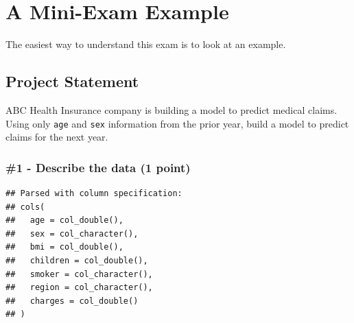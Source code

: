 \documentclass[]{book}
\newenvironment{Shaded}{\begin{snugshade}}{\end{snugshade}}
\newcommand{\CommentTok}[1]{\textcolor[rgb]{0.56,0.35,0.01}{\textit{#1}}}
\newcommand{\DataTypeTok}[1]{\textcolor[rgb]{0.13,0.29,0.53}{#1}}
\newcommand{\KeywordTok}[1]{\textcolor[rgb]{0.13,0.29,0.53}{\textbf{#1}}}
\newcommand{\NormalTok}[1]{#1}
\newcommand{\OperatorTok}[1]{\textcolor[rgb]{0.81,0.36,0.00}{\textbf{#1}}}
\newcommand{\StringTok}[1]{\textcolor[rgb]{0.31,0.60,0.02}{#1}}
\begin{document}
\hypertarget{a-mini-exam-example}{%
\chapter{A Mini-Exam Example}\label{a-mini-exam-example}}

The easiest way to understand this exam is to look at an example.

\hypertarget{project-statement}{%
\section{Project Statement}\label{project-statement}}

ABC Health Insurance company is building a model to predict medical claims. Using only \texttt{age} and \texttt{sex} information from the prior year, build a model to predict claims for the next year.

\hypertarget{describe-the-data-1-point}{%
\subsection{\#1 - Describe the data (1 point)}\label{describe-the-data-1-point}}

\begin{Shaded}
\end{Shaded}

\begin{verbatim}
## Parsed with column specification:
## cols(
##   age = col_double(),
##   sex = col_character(),
##   bmi = col_double(),
##   children = col_double(),
##   smoker = col_character(),
##   region = col_character(),
##   charges = col_double()
## )
\end{verbatim}

\begin{Shaded}
\end{Shaded}
\end{document}
